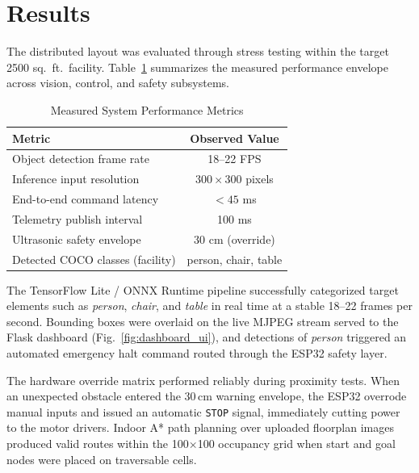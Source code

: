 \documentclass[conference]{IEEEtran}
\begin{document}
\section{Results}
The distributed layout was evaluated through stress testing within the target 2500 sq.~ft.\ facility. Table~\ref{tab:performance_metrics} summarizes the measured performance envelope across vision, control, and safety subsystems.

\begin{table}[htbp]
\caption{Measured System Performance Metrics}
\begin{center}
\begin{tabular}{lc}
\toprule
\textbf{Metric} & \textbf{Observed Value} \\
\midrule
Object detection frame rate & 18--22 FPS \\
Inference input resolution & $300 \times 300$ pixels \\
End-to-end command latency & $< 45$ ms \\
Telemetry publish interval & 100 ms \\
Ultrasonic safety envelope & 30 cm (override) \\
Detected COCO classes (facility) & person, chair, table \\
\bottomrule
\end{tabular}
\label{tab:performance_metrics}
\end{center}
\end{table}

The TensorFlow Lite / ONNX Runtime pipeline successfully categorized target elements such as \textit{person}, \textit{chair}, and \textit{table} in real time at a stable 18--22 frames per second. Bounding boxes were overlaid on the live MJPEG stream served to the Flask dashboard (Fig.~\ref{fig:dashboard_ui}), and detections of \textit{person} triggered an automated emergency halt command routed through the ESP32 safety layer.

The hardware override matrix performed reliably during proximity tests. When an unexpected obstacle entered the 30\,cm warning envelope, the ESP32 overrode manual inputs and issued an automatic \texttt{STOP} signal, immediately cutting power to the motor drivers. Indoor A* path planning over uploaded floorplan images produced valid routes within the 100$\times$100 occupancy grid when start and goal nodes were placed on traversable cells.
\end{document}
